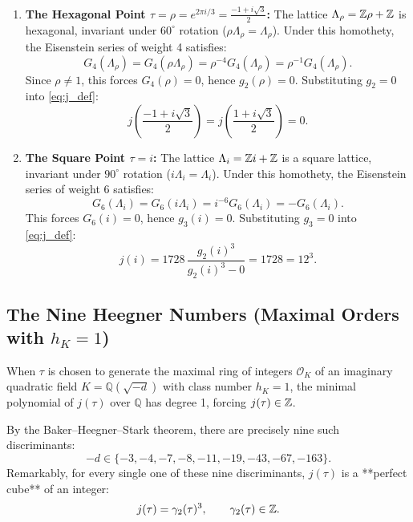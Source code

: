 \documentclass[a4paper]{article}
\begin{document}
\begin{enumerate}[leftmargin=2em]
 \item \textbf{The Hexagonal Point $\tau = \rho = e^{2\pi i/3} = \frac{-1+i\sqrt{3}}{2}$:}
 The lattice $\Lambda_\rho = \mathbb{Z}\rho + \mathbb{Z}$ is hexagonal, invariant under $60^\circ$ rotation ($\rho \Lambda_\rho = \Lambda_\rho$). 
 Under this homothety, the Eisenstein series of weight 4 satisfies:
 \begin{equation}
  G_4(\Lambda_\rho) = G_4(\rho \Lambda_\rho) = \rho^{-4} G_4(\Lambda_\rho) = \rho^{-1} G_4(\Lambda_\rho).
 \end{equation}
 Since $\rho \ne 1$, this forces $G_4(\rho) = 0$, hence $g_2(\rho) = 0$.
 Substituting $g_2 = 0$ into \eqref{eq:j_def}:
 \begin{equation}
  \boxed{j\left(\frac{-1+i\sqrt{3}}{2}\right) = j\left(\frac{1+i\sqrt{3}}{2}\right) = 0}.
 \end{equation}
 
 \item \textbf{The Square Point $\tau = i$:}
 The lattice $\Lambda_i = \mathbb{Z} i + \mathbb{Z}$ is a square lattice, invariant under $90^\circ$ rotation ($i \Lambda_i = \Lambda_i$).
 Under this homothety, the Eisenstein series of weight 6 satisfies:
 \begin{equation}
  G_6(\Lambda_i) = G_6(i \Lambda_i) = i^{-6} G_6(\Lambda_i) = -G_6(\Lambda_i).
 \end{equation}
 This forces $G_6(i) = 0$, hence $g_3(i) = 0$.
 Substituting $g_3 = 0$ into \eqref{eq:j_def}:
 \begin{equation}
  \boxed{j(i) = 1728 \, \frac{g_2(i)^3}{g_2(i)^3 - 0} = 1728 = 12^3}.
 \end{equation}
\end{enumerate}

\subsection{The Nine Heegner Numbers (Maximal Orders with \texorpdfstring{$h_K = 1$}{hK = 1})}
When $\tau$ is chosen to generate the maximal ring of integers $\mathcal{O}_K$ of an imaginary quadratic field $K = \mathbb{Q}(\sqrt{-d})$ with class number $h_K = 1$, the minimal polynomial of $j(\tau)$ over $\mathbb{Q}$ has degree 1, forcing $j(\tau) \in \mathbb{Z}$.

By the Baker--Heegner--Stark theorem, there are precisely nine such discriminants:
\begin{equation}
 -d \in \{-3, -4, -7, -8, -11, -19, -43, -67, -163\}.
\end{equation}
Remarkably, for every single one of these nine discriminants, $j(\tau)$ is a **perfect cube** of an integer:
\begin{equation}
 j(\tau) = \gamma_2(\tau)^3, \qquad \gamma_2(\tau) \in \mathbb{Z}.
\end{equation}
\end{document}
